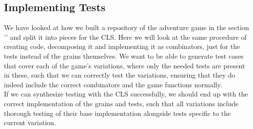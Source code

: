 \subsection{Implementing Tests}
We have looked at how we built a repository of the adventure game in the section '' and split it into pieces for the CLS. Here we will look at the same procedure of creating code, decomposing it and implementing it as combinators, just for the tests instead of the grains themselves. We want to be able to generate test cases that cover each of the game's variations, where only the needed tests are present in these, such that we can correctly test the variations, ensuring that they do indeed include the correct combinators and the game functions normally. \\
If we can synthesize testing with the CLS successfully, we should end up with the correct implementation of the grains and tests, such that all variations include thorough testing of their base implementation alongside tests specific to the current variation.  





